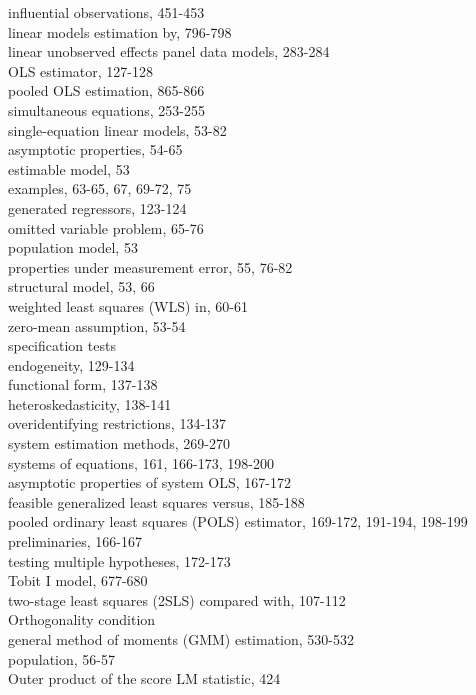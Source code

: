 \documentclass[10pt]{article}
\begin{document}
influential observations, 451-453\\
linear models estimation by, 796-798\\
linear unobserved effects panel data models, 283-284\\
OLS estimator, 127-128\\
pooled OLS estimation, 865-866\\
simultaneous equations, 253-255\\
single-equation linear models, 53-82\\
asymptotic properties, 54-65\\
estimable model, 53\\
examples, 63-65, 67, 69-72, 75\\
generated regressors, 123-124\\
omitted variable problem, 65-76\\
population model, 53\\
properties under measurement error, 55, 76-82\\
structural model, 53, 66\\
weighted least squares (WLS) in, 60-61\\
zero-mean assumption, 53-54\\
specification tests\\
endogeneity, 129-134\\
functional form, 137-138\\
heteroskedasticity, 138-141\\
overidentifying restrictions, 134-137\\
system estimation methods, 269-270\\
systems of equations, 161, 166-173, 198-200\\
asymptotic properties of system OLS, 167-172\\
feasible generalized least squares versus, 185-188\\
pooled ordinary least squares (POLS) estimator, 169-172, 191-194, 198-199\\
preliminaries, 166-167\\
testing multiple hypotheses, 172-173\\
Tobit I model, 677-680\\
two-stage least squares (2SLS) compared with, 107-112\\
Orthogonality condition\\
general method of moments (GMM) estimation, 530-532\\
population, 56-57\\
Outer product of the score LM statistic, 424\\
\end{document}
